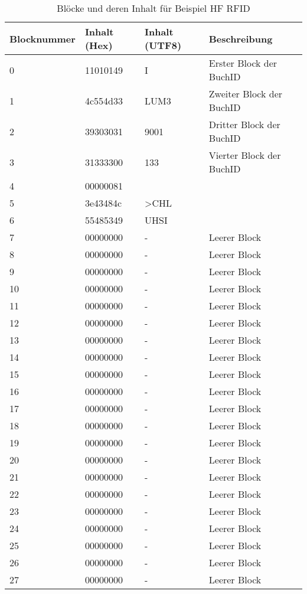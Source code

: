 \begin{table}[htb]
	\begin{tabularx}{\textwidth}{|l|l|l|X|}
		\hline
		\textbf{Blocknummer} & \textbf{Inhalt (Hex)} & \textbf{Inhalt (UTF8)} & \textbf{Beschreibung}\\
		\hline
		0 & 11010149 & I & Erster Block der BuchID \\
		\hline
		1 & 4c554d33 & LUM3 & Zweiter Block der BuchID \\
		\hline
		2 & 39303031 & 9001 & Dritter Block der BuchID \\
		\hline
		3 & 31333300 & 133 & Vierter Block der BuchID \\
		\hline
		4 & 00000081 &  & \\
		\hline
		5 & 3e43484c & >CHL & \\
		\hline
		6 & 55485349 & UHSI & \\
		\hline
		7 & 00000000 & - & Leerer Block \\
		\hline
		8 & 00000000 & - & Leerer Block \\
		\hline
		9 & 00000000 & - & Leerer Block \\
		\hline
		10 & 00000000 & - & Leerer Block \\
		\hline
		11 & 00000000 & - & Leerer Block \\
		\hline
		12 & 00000000 & - & Leerer Block \\
		\hline
		13 & 00000000 & - & Leerer Block \\
		\hline
		14 & 00000000 & - & Leerer Block \\
		\hline
		15 & 00000000 & - & Leerer Block \\
		\hline
		16 & 00000000 & - & Leerer Block \\
		\hline
		17 & 00000000 & - & Leerer Block \\
		\hline
		18 & 00000000 & - & Leerer Block \\
		\hline
		19 & 00000000 & - & Leerer Block \\
		\hline
		20 & 00000000 & - & Leerer Block \\
		\hline
		21 & 00000000 & - & Leerer Block \\
		\hline
		22 & 00000000 & - & Leerer Block \\
		\hline
		23 & 00000000 & - & Leerer Block \\
		\hline
		24 & 00000000 & - & Leerer Block \\
		\hline
		25 & 00000000 & - & Leerer Block \\
		\hline
		26 & 00000000 & - & Leerer Block \\
		\hline
		27 & 00000000 & - & Leerer Block \\
		\hline
	\end{tabularx}
	\caption{Blöcke und deren Inhalt für Beispiel HF RFID}
	\label{tbl:ListeBloecke}
\end{table}

